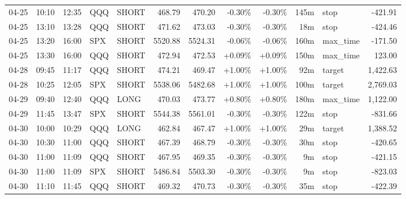 \documentclass[11pt,a4paper]{article}
\begin{document}
\begin{center}
\begin{longtable}{>{\color{txtmain}}l l l l l r r r r r >{\color{txtmain}}l r}
04-25 & 10:10 & 12:35 & QQQ & SHORT & 468.79 & 470.20 & \textcolor{lossred}{-0.30\%} & \textcolor{lossred}{-0.30\%} & 145m & stop & \textcolor{lossred}{-421.91} \\
04-25 & 13:10 & 13:28 & QQQ & SHORT & 471.62 & 473.03 & \textcolor{lossred}{-0.30\%} & \textcolor{lossred}{-0.30\%} & 18m & stop & \textcolor{lossred}{-424.46} \\
04-25 & 13:20 & 16:00 & SPX & SHORT & 5520.88 & 5524.31 & \textcolor{lossred}{-0.06\%} & \textcolor{lossred}{-0.06\%} & 160m & max\_time & \textcolor{lossred}{-171.50} \\
04-25 & 13:30 & 16:00 & QQQ & SHORT & 472.94 & 472.53 & \textcolor{wingreen}{+0.09\%} & \textcolor{wingreen}{+0.09\%} & 150m & max\_time & \textcolor{wingreen}{123.00} \\
04-28 & 09:45 & 11:17 & QQQ & SHORT & 474.21 & 469.47 & \textcolor{wingreen}{+1.00\%} & \textcolor{wingreen}{+1.00\%} & 92m & target & \textcolor{wingreen}{1,422.63} \\
04-28 & 10:25 & 12:05 & SPX & SHORT & 5538.06 & 5482.68 & \textcolor{wingreen}{+1.00\%} & \textcolor{wingreen}{+1.00\%} & 100m & target & \textcolor{wingreen}{2,769.03} \\
04-29 & 09:40 & 12:40 & QQQ & LONG & 470.03 & 473.77 & \textcolor{wingreen}{+0.80\%} & \textcolor{wingreen}{+0.80\%} & 180m & max\_time & \textcolor{wingreen}{1,122.00} \\
04-29 & 11:45 & 13:47 & SPX & SHORT & 5544.38 & 5561.01 & \textcolor{lossred}{-0.30\%} & \textcolor{lossred}{-0.30\%} & 122m & stop & \textcolor{lossred}{-831.66} \\
04-30 & 10:00 & 10:29 & QQQ & LONG & 462.84 & 467.47 & \textcolor{wingreen}{+1.00\%} & \textcolor{wingreen}{+1.00\%} & 29m & target & \textcolor{wingreen}{1,388.52} \\
04-30 & 10:30 & 11:00 & QQQ & SHORT & 467.39 & 468.79 & \textcolor{lossred}{-0.30\%} & \textcolor{lossred}{-0.30\%} & 30m & stop & \textcolor{lossred}{-420.65} \\
04-30 & 11:00 & 11:09 & QQQ & SHORT & 467.95 & 469.35 & \textcolor{lossred}{-0.30\%} & \textcolor{lossred}{-0.30\%} & 9m & stop & \textcolor{lossred}{-421.15} \\
04-30 & 11:00 & 11:09 & SPX & SHORT & 5486.84 & 5503.30 & \textcolor{lossred}{-0.30\%} & \textcolor{lossred}{-0.30\%} & 9m & stop & \textcolor{lossred}{-823.03} \\
04-30 & 11:10 & 11:45 & QQQ & SHORT & 469.32 & 470.73 & \textcolor{lossred}{-0.30\%} & \textcolor{lossred}{-0.30\%} & 35m & stop & \textcolor{lossred}{-422.39} \\

\end{longtable}
\end{center}
\end{document}

